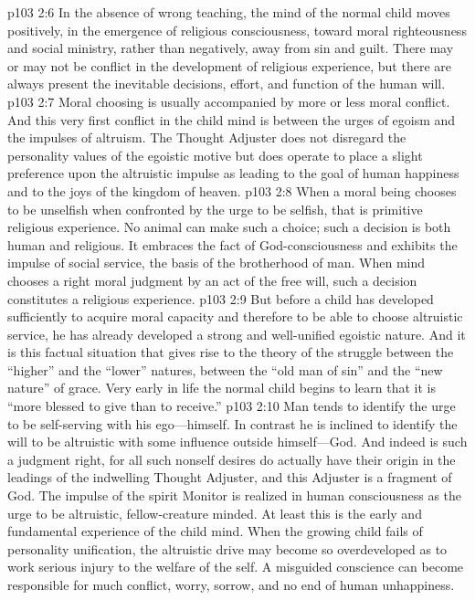 \vs p103 2:6 In the absence of wrong teaching, the mind of the normal child moves positively, in the emergence of religious consciousness, toward moral righteousness and social ministry, rather than negatively, away from sin and guilt. There may or may not be conflict in the development of religious experience, but there are always present the inevitable decisions, effort, and function of the human will.
\vs p103 2:7 Moral choosing is usually accompanied by more or less moral conflict. And this very first conflict in the child mind is between the urges of egoism and the impulses of altruism. The Thought Adjuster does not disregard the personality values of the egoistic motive but does operate to place a slight preference upon the altruistic impulse as leading to the goal of human happiness and to the joys of the kingdom of heaven.\plusone
\vs p103 2:8 When a moral being chooses to be unselfish when confronted by the urge to be selfish, that is primitive religious experience. No animal can make such a choice; such a decision is both human and religious. It embraces the fact of God\hyp{}consciousness and exhibits the impulse of social service, the basis of the brotherhood of man. When mind chooses a right moral judgment by an act of the free will, such a decision constitutes a religious experience.
\vs p103 2:9 But before a child has developed sufficiently to acquire moral capacity and therefore to be able to choose altruistic service, he has already developed a strong and well\hyp{}unified egoistic nature. And it is this factual situation that gives rise to the theory of the struggle between the “higher” and the “lower” natures, between the “old man of sin” and the “new nature” of grace. Very early in life the normal child begins to learn that it is “more blessed to give than to receive.”
\vs p103 2:10 Man tends to identify the urge to be self\hyp{}serving with his ego---himself. In contrast he is inclined to identify the will to be altruistic with some influence outside himself---God. And indeed is such a judgment right, for all such nonself desires do actually have their origin in the leadings of the indwelling Thought Adjuster, and this Adjuster is a fragment of God. The impulse of the spirit Monitor is realized in human consciousness as the urge to be altruistic, fellow\hyp{}creature minded. At least this is the early and fundamental experience of the child mind. When the growing child fails of personality unification, the altruistic drive may become so overdeveloped as to work serious injury to the welfare of the self. A misguided conscience can become responsible for much conflict, worry, sorrow, and no end of human unhappiness.
